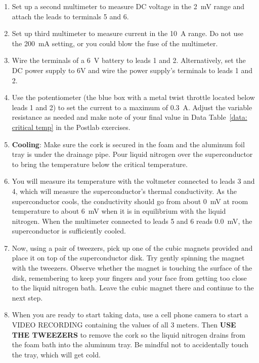 \documentclass[addpoints]{physlabs}
\begin{document}
\begin{labsection}
\begin{experiment}
\begin{enumerate}
    \item Set up a second multimeter to measure DC voltage in the \qty{2}{\milli\volt} range and attach the leads to terminals 5 and 6.

    \item Set up third multimeter to measure current in the \qty{10}{\ampere} range. Do not use the \qty{200}{\milli\ampere} setting, or you could blow the fuse of the multimeter.

    \item Wire the terminals of a \qty{6}{\volt} battery to leads 1 and 2. Alternatively, set the DC power supply to 6V and wire the power supply's terminals to leads 1 and 2.

    \item Use the potentiometer (the blue box with a metal twist throttle located below leads 1 and 2) to set the current to a maximum of \qty{0.3}{\ampere}. Adjust the variable resistance as needed and make note of your final value in Data Table~\ref{data: critical temp} in the Postlab exercises.

    \item \textbf{Cooling}: Make sure the cork is secured in the foam and the aluminum foil tray is under the drainage pipe. Pour liquid nitrogen over the superconductor to bring the temperature below the critical temperature.
    
    \item You will measure its temperature with the voltmeter connected to leads 3 and 4, which will measure the superconductor's thermal conductivity. As the superconductor cools, the conductivity should go from about \qty{0}{\milli\volt} at room temperature to about \qty{6}{\milli\volt} when it is in equilibrium with the liquid nitrogen. When the multimeter connected to leads 5 and 6 reads \qty{0.0}{\milli\volt}, the superconductor is sufficiently cooled.

    \item Now, using a pair of tweezers, pick up one of the cubic magnets provided and place it on top of the superconductor disk. Try gently spinning the magnet with the tweezers. Observe whether the magnet is touching the surface of the disk, remembering to keep your fingers and your face from getting too close to the liquid nitrogen bath. Leave the cubic magnet there and continue to the next step.

    \item When you are ready to start taking data, use a cell phone camera to start a VIDEO RECORDING containing the values of all 3 meters. 
    Then \textbf{USE THE TWEEZERS} to remove the cork so the liquid nitrogen drains from the foam bath into the aluminum tray. 
    Be mindful not to accidentally touch the tray, which will get cold.


\end{enumerate}
\end{experiment}
\end{labsection}
\end{document}
